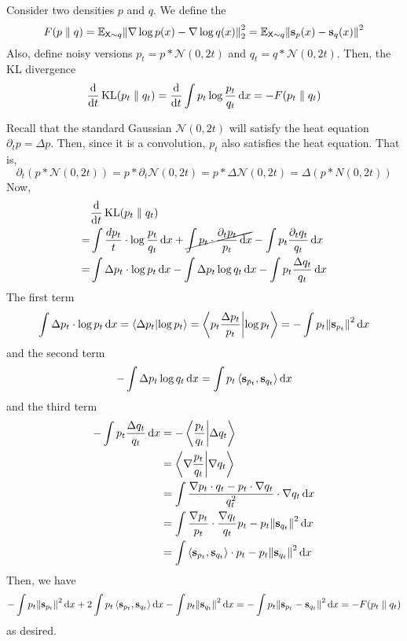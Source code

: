 \documentclass[notes]{agony}
\newcommand{\E}{\mathbb{E}}
\newcommand{\rv}{\mathsf}
\newcommand{\X}{\rv{X}}
\renewcommand{\N}{\mathcal{N}}
\begin{document}
Consider two densities $p$ and $q$.
We define the 
\[
	F(p \parallel q)
	= \E_{\X \sim q}\norm{\nabla \log p(x) - \nabla \log q(x)}_2^2
	= \E_{\X \sim q} \norm{\vb s_p(x) - \vb s_q(x)}^2
\]
Also, define noisy versions $p_t = p \ast \N(0,2t)$ and $q_t = q \ast \N(0,2t)$.
Then, the KL divergence
\begin{align*}
	\dv{t} \operatorname{KL}(p_t \parallel q_t)
	= \dv{t} \int p_t \log\frac{p_t}{q_t} \dd{x}
	= -F(p_t \parallel q_t)
\end{align*}
\begin{prf}
	Recall that the standard Gaussian $\N(0,2t)$ will satisfy the heat equation
	$\partial_t p = \Delta p$.
	Then, since it is a convolution, $p_t$ also satisfies the heat equation.
	That is,
	\[
		\partial_t(p \ast \N(0,2t))
		= p \ast \partial_t \N(0,2t)
		= p \ast \Delta \N(0,2t)
		= \Delta (p \ast N(0,2t))
	\]
	Now,
	\begin{align*}
		  & \dv{t} \operatorname{KL}(p_t \parallel q_t)          \\
		= & \int \frac{dp_t}{t} \cdot \log\frac{p_t}{q_t} \dd{x}
		+ \cancel{\int p_t \cdot \frac{\partial_t p_t}{p_t} \dd{x}}
		- \int p_t\frac{\partial_t q_t}{q_t}\dd{x}               \\
		= & \int \Delta p_t \cdot \log p_t \dd{x}
		- \int \Delta p_t \log q_t \dd{x}
		- \int p_t \frac{\Delta q_t}{q_t} \dd{x}
	\end{align*}
	The first term
	\[
		\int \Delta p_t \cdot \log p_t \dd{x}
		= \ip{\Delta p_t}{\log p_t} = \ip{p_t\frac{\Delta p_t}{p_t}}{\log p_t} = -\int p_t\norm{\vb s_{p_t}}^2 \dd{x}
	\]
	and the second term
	\[
		-\int \Delta p_t \log q_t \dd{x} = \int p_t\ev{\vb s_{p_t}, \vb s_{q_t}} \dd{x}
	\]
	and the third term
	\begin{align*}
		-\int p_t \frac{\Delta q_t}{q_t} \dd{x}
		 & = -\ip{\frac{p_t}{q_t}}{\Delta q_t}                                                            \\
		 & = \ip{\nabla\frac{p_t}{q_t}}{\nabla q_t}                                                       \\
		 & = \int \frac{\nabla p_t \cdot q_t - p_t \cdot \nabla q_t}{q_t^2} \cdot \nabla q_t \dd{x}       \\
		 & = \int \frac{\nabla p_t}{p_t}\cdot\frac{\nabla q_t}{q_t} p_t - p_t \norm{\vb s_{q_t}}^2 \dd{x} \\
		 & = \int \ev{\vb s_{p_t}, \vb s_{q_t}} \cdot p_t - p_t \norm{\vb s_{q_t}}^2 \dd{x}
	\end{align*}
	Then, we have
	\begin{align*}
		-\int p_t\norm{\vb s_{p_t}}^2 \dd{x}
		+ 2\int p_t\ev{\vb s_{p_t}, \vb s_{q_t}} \dd{x}
		- \int p_t \norm{\vb s_{q_t}}^2 \dd{x}
		= -\int p_t\norm{\vb s_{p_t} - \vb s_{q_t}}^2 \dd{x}
		= -F(p_t \parallel q_t)
	\end{align*}
	as desired.
\end{prf}
\end{document}

